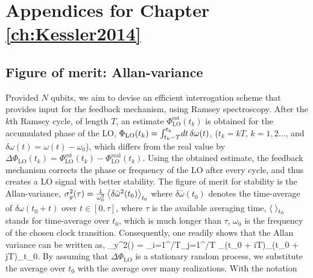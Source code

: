 \chapter{Appendices for Chapter \ref{ch:Kessler2014}}
\label{app:Kessler2014}

\section{Figure of merit: Allan-variance}
\label{app:Allan_variance}
Provided $N$ qubits, we aim to devise an efficient interrogation scheme that
provides input for the feedback mechanism, using Ramsey spectroscopy. After the
$k$th Ramsey cycle, of length $T$, an estimate $\Phi^\mathrm{est}_\mathrm{LO}(t_k)$
is obtained for the accumulated phase of the LO, $\Phi_\mathrm{LO}(t_k) =
\intop_{t_k-T}^{t_k}\d{t}\delta\omega(t)$, ($t_k = kT$, $k=1,2\dots$, and
$\delta\omega(t) =\omega(t)- \omega_0$), which differs from the real value by
$\Delta\Phi_\mathrm{LO}(t_k) = \Phi^\mathrm{est}_\mathrm{LO}(t_k) -
\Phi^\mathrm{real}_\mathrm{LO}(t_k)$.
Using the obtained estimate, the feedback mechanism corrects the phase or
frequency of the LO after every cycle, and thus creates a LO signal with better
stability.
The figure of merit for stability is the Allan-variance,
$ 
	\sigma_y^2(\tau) = \frac{1}{\omega_0^2}
	\left< \delta\bar\omega^2(t_0) \right>_{t_0}
$
where $\delta\bar\omega(t_0)$ denotes the time-average of $\delta\omega(t_0 +
t)$ over $t\in[0,\tau]$, where $\tau$ is the available averaging time,
$\left< \; \right>_{t_0}$ stands for time-average over $t_0$, which is much longer than
 $\tau$, $\omega_0$ is the frequency of the chosen
clock transition. Consequently, one readily shows that the Allan variance can be written as,
\bel
	\sigma_y^2(\tau) = 
	\sum_{i=1}^{\tau/T}\sum_{j=1}^{\tau/T} \Big\langle\Delta\Phi_(t_0 +
	iT)\Delta\Phi_(t_0 + jT)\Big\rangle_{t_0}.
\eel
By assuming that $\Delta\Phi_\mathrm{LO}$ is a stationary random process, we
substitute the average over $t_0$ with the average over many realizations. With the notation
